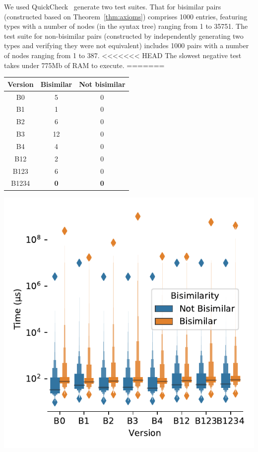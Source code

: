 We used QuickCheck~\cite{DBLP:conf/icfp/ClaessenH00} generate two test
suites. That for bisimilar pairs (constructed based on
Theorem~\ref{thm:axioms}) comprises 1000 entries, featuring types with
a number of nodes (in the syntax tree) ranging from 1 to 35751. The
test suite for non-bisimilar pairs (constructed by independently
generating two types and verifying they were not equivalent) includes
1000 pairs with a number of nodes ranging from 1 to 387.
%
<<<<<<< HEAD
The slowest negative test takes under 775Mb of RAM to execute.
=======
  \begin{minipage}[b]{0.49\textwidth}
   {\small 
  \centering
 
	\begin{tabular}{ |c|c|c| }
	 \hline
 		Version &  {\color{MidnightBlue}Bisimilar} & {\color{orange}Not bisimilar}  \\ 
 		 \hline
	 	B0 & 5 & 0 \\  
	 	B1 &  1 & 0 \\ 
	 	B2 & 6 & 0 \\ 
	 	B3 &  12 & 0 \\
	 	B4 &  4 & 0 \\
	 	B12 &  2 & 0 \\   
	 	B123 &  6 & 0 \\
	 	B1234 &  \bf{0} & \bf{0} \\ 
	 	 \hline  
	\end{tabular}\vspace*{6mm}
	}
	\end{minipage}
	\hfill
\begin{minipage}[b]{0.49\textwidth}
 {\small 
\centering
    \includegraphics[height=.85\textwidth]{img/distribution_boxplot}%
    }
\end{minipage}
